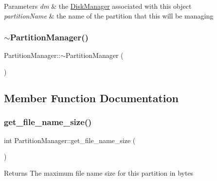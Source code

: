 \begin{DoxyParams}{Parameters}
{\em dm} & the \mbox{\hyperlink{class_disk_manager}{Disk\+Manager}} associated with this object \\
\hline
{\em partition\+Name} & the name of the partition that this will be managing \\
\hline
\end{DoxyParams}
\mbox{\label{class_partition_manager_aa8ab74a681e67990ae59054a7b7daafe}} 
\subsubsection{\texorpdfstring{$\sim$\+Partition\+Manager()}{~PartitionManager()}}
{\footnotesize\ttfamily Partition\+Manager\+::$\sim$\+Partition\+Manager (\begin{DoxyParamCaption}{ }\end{DoxyParamCaption})}



\subsection{Member Function Documentation}
\mbox{\label{class_partition_manager_a3b047c1c63c2f9a9e04805471c04ccf0}} 
\subsubsection{\texorpdfstring{get\+\_\+file\+\_\+name\+\_\+size()}{get\_file\_name\_size()}}
{\footnotesize\ttfamily int Partition\+Manager\+::get\+\_\+file\+\_\+name\+\_\+size (\begin{DoxyParamCaption}{ }\end{DoxyParamCaption})}

\begin{DoxyReturn}{Returns}
The maximum file name size for this partition in bytes 
\end{DoxyReturn}
\mbox{\label{class_partition_manager_aa1026e17e77f154d7034fafd188bda02}} 
